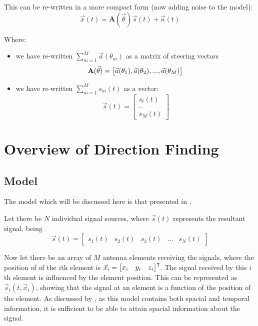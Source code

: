 This can be re-written in a more compact form (now adding noise to the model):
\begin{equation}
  \vec{x}(t) = \mathbf{A}(\vec{\theta})\vec{s}(t) + \vec{n}(t)
\end{equation}

Where:
\begin{itemize} 
  \item we have re-written \(\sum_{m=1}^{M}\vec{a}(\theta_m)\) as a matrix of steering vectors
\begin{equation} 
  \mathbf{A}(\vec{\theta}) = \begin{bmatrix} \vec{a}(\theta_1), \vec{a}(\theta_2), ..., \vec{a}(\theta_M) \end{bmatrix} \\
\end{equation}
  \item we have re-written  \(\sum_{m=1}^{M}s_m(t)\) as a vector:
\begin{equation}
  \vec{s}(t) = \begin{bmatrix} s_t(t) \\ .. \\ s_M(t) \end{bmatrix}
\end{equation}
\end{itemize}
\section{Overview of Direction Finding}

\subsection{Model}
The model which will be discussed here is that presented in \cite{poisel2012electronic}.  

Let there be $N$ individual signal sources, where $\vec{s}(t)$ represents the resultant signal, being
\begin{equation}
\vec{s}(t) = \begin{bmatrix} s_{1}(t) & s_{2}(t) & s_3(t) & ... & s_N(t) \end{bmatrix}
\end{equation}

Now let there be an array of $M$ antenna elements receiving the signals, where the position of of the \(i\)th element is \(\vec{x}_{i} = \begin{bmatrix}x_i & y_i & z_i \end{bmatrix}^\intercal\). 
The signal received by this \(i\)th element is influenced by the element position. 
This can be represented as \(\vec{s}_i(t, \vec{x}_i)\), showing that the signal at an element is a function of the position of the element.
As discussed by \cite{krim1996two}, as this model contains both spacial and temporal information, it is sufficient to be able to attain spacial information about the signal. 

